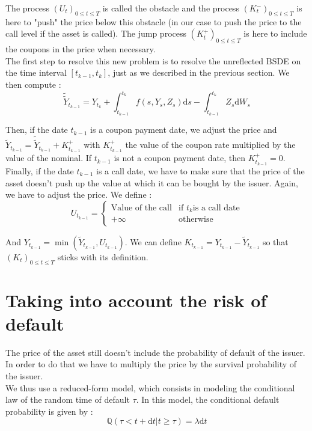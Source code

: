 \documentclass[a4paper,11pt,english]{book}
\begin{document}
The process $(U_{t})_{0\leq t \leq T}$ is called the obstacle and the process $(K_{t}^{-})_{0\leq t \leq T}$ is here to "push" the price below this obstacle (in our case to push the price to the call level if the asset is called). The jump process $(K_{t}^{+})_{0\leq t \leq T}$ is here to include the coupons in the price when necessary. \\

The first step to resolve this new problem is to resolve the unreflected BSDE on the time interval $[t_{k-1},t_{k}]$, just as we described in the previous section. We then compute : $$\widetilde{\widetilde{Y}}_{t_{k-1}}=Y_{t_{k}}+\int_{t_{k-1}}^{t_{k}}f(s,Y_{s},Z_{s})\text{d}s-\int_{t_{k-1}}^{t_{k}}Z_{s}\text{d}W_{s}$$

Then, if the date $t_{k-1}$ is a coupon payment date, we adjust the price and $\widetilde{Y}_{t_{k-1}}= \widetilde{\widetilde{Y}}_{t_{k-1}} + K_{t_{k-1}}^{+}$ with $K_{t_{k-1}}^{+}$ the value of the coupon rate multiplied by the value of the nominal. If $t_{k-1}$ is not a coupon payment date, then $K_{t_{k-1}}^{+}=0$.\\
Finally, if the date $t_{k-1}$ is a call date, we have to make sure that the price of the asset doesn't push up the value at which it can be bought by the issuer. Again, we have to adjust the price. We define :
$$U_{t_{k-1}}=
\begin{cases}
\text{Value of the call} & \text{if } t_k \text{is a call date}\\
+\infty & \text{otherwise }
\end{cases}$$

And $Y_{t_{k-1}}=\min(\widetilde{Y}_{t_{k-1}},U_{t_{k-1}})$. We can define $K_{t_{k-1}}=Y_{t_{k-1}}-\widetilde{Y}_{t_{k-1}}$ so that $(K_{t})_{0\leq t\leq T}$ sticks with its definition.

\section{Taking into account the risk of default}
The price of the asset still doesn't include the probability of default of the issuer. In order to do that we have to multiply the price by the survival probability of the issuer.\\

We thus use a reduced-form model, which consists in modeling the conditional law of the random time of default $\tau$. In this model, the conditional default probability is given by :
\begin{equation}
    \mathbb{Q}(\tau<t+\text{d}t|t\geq \tau)=\lambda \text{d}t
    \label{eq:reduced-form}
\end{equation}
\end{document}
